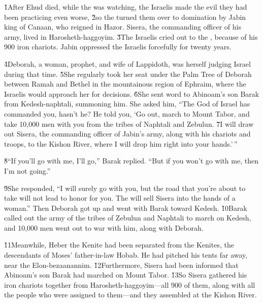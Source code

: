 \v{1}After Ehud died, while the  was watching, the Israelis made the evil they had been practicing even worse, \v{2}so the  turned them over to domination by Jabin king of Canaan, who reigned in Hazor. Sisera, the commanding officer of his army, lived in Harosheth-haggoyim. \v{3}The Israelis cried out to the , because of his 900 iron chariots. Jabin oppressed the Israelis forcefully for twenty years.

\v{4}Deborah, a woman, prophet, and wife of Lappidoth, was herself judging Israel during that time. \v{5}She regularly took her seat under the Palm Tree of Deborah between Ramah and Bethel in the mountainous region of Ephraim, where the Israelis would approach her for decisions. \v{6}She sent word to Abinoam's son Barak from Kedesh-naphtali, summoning him. She asked him, ``The  God of Israel has commanded you, hasn't he? He told you, `Go out, march to Mount Tabor, and take 10,000 men with you from the tribes of Naphtali and Zebulun. \v{7}I will draw out Sisera, the commanding officer of Jabin's army, along with his chariots and troops, to the Kishon River, where I will drop him right into your hands.'\,''

\v{8}``If you'll go with me, I'll go,'' Barak replied. ``But if you won't go with me, then I'm not going.''

\v{9}She responded, ``I will surely go with you, but the road that you're about to take will not lead to honor for you. The  will sell Sisera into the hands of a woman.'' Then Deborah got up and went with Barak toward Kedesh. \v{10}Barak called out the army of the tribes of Zebulun and Naphtali to march on Kedesh, and 10,000 men went out to war with him, along with Deborah.

\v{11}Meanwhile, Heber the Kenite had been separated from the Kenites, the descendants of Moses' father-in-law Hobab. He had pitched his tents far away, near the Elon-bezaanannim. \v{12}Furthermore, Sisera had been informed that Abinoam's son Barak had marched on Mount Tabor. \v{13}So Sisera gathered his iron chariots together from Harosheth-haggoyim---all 900 of them, along with all the people who were assigned to them---and they assembled at the Kishon River.

